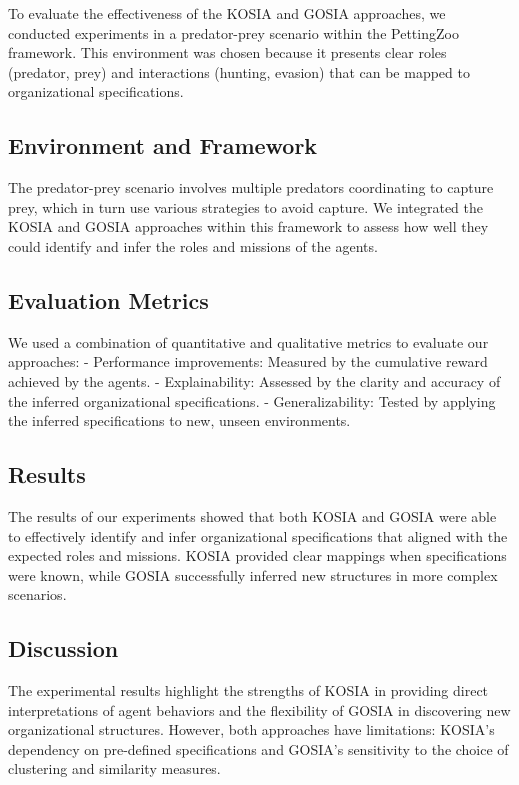\documentclass[sn-mathphys-num]{sn-jnl}%
\theoremstyle{thmstyleone}%
\theoremstyle{thmstyletwo}%
\theoremstyle{thmstylethree}%
\begin{document}
To evaluate the effectiveness of the KOSIA and GOSIA approaches, we conducted experiments in a predator-prey scenario within the PettingZoo framework. This environment was chosen because it presents clear roles (predator, prey) and interactions (hunting, evasion) that can be mapped to organizational specifications.

\subsection{Environment and Framework}

The predator-prey scenario involves multiple predators coordinating to capture prey, which in turn use various strategies to avoid capture. We integrated the KOSIA and GOSIA approaches within this framework to assess how well they could identify and infer the roles and missions of the agents.

\subsection{Evaluation Metrics}

We used a combination of quantitative and qualitative metrics to evaluate our approaches:
- Performance improvements: Measured by the cumulative reward achieved by the agents.
- Explainability: Assessed by the clarity and accuracy of the inferred organizational specifications.
- Generalizability: Tested by applying the inferred specifications to new, unseen environments.

\subsection{Results}

The results of our experiments showed that both KOSIA and GOSIA were able to effectively identify and infer organizational specifications that aligned with the expected roles and missions. KOSIA provided clear mappings when specifications were known, while GOSIA successfully inferred new structures in more complex scenarios.

\subsection{Discussion}

The experimental results highlight the strengths of KOSIA in providing direct interpretations of agent behaviors and the flexibility of GOSIA in discovering new organizational structures. However, both approaches have limitations: KOSIA's dependency on pre-defined specifications and GOSIA's sensitivity to the choice of clustering and similarity measures.
\end{document}
